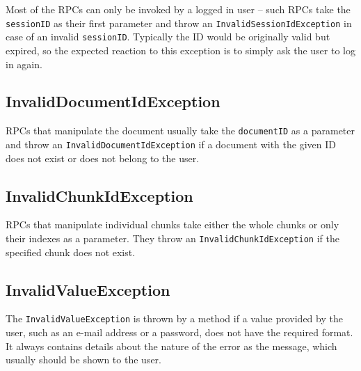 Most of the RPCs can only be invoked by a logged in user -- such RPCs take the {\tt sessionID} as their first parameter and throw an {\tt InvalidSessionIdException} in case of an invalid {\tt sessionID}. Typically the ID would be originally valid but expired, so the expected reaction to this exception is to simply ask the user to log in again.

\subsection{InvalidDocumentIdException}

RPCs that manipulate the document usually take the {\tt documentID} as a parameter and throw an {\tt InvalidDocumentIdException} if a document with the given ID does not exist or does not belong to the user.

\subsection{InvalidChunkIdException}

RPCs that manipulate individual chunks take either the whole chunks or only their indexes as a parameter. They throw an {\tt InvalidChunkIdException} if the specified chunk does not exist.

\subsection{InvalidValueException}

The {\tt InvalidValueException} is thrown by a method if a value provided by the user, such as an e-mail address or a password, does not have the required format. It always contains details about the nature of the error as the message, which usually should be shown to the user.
